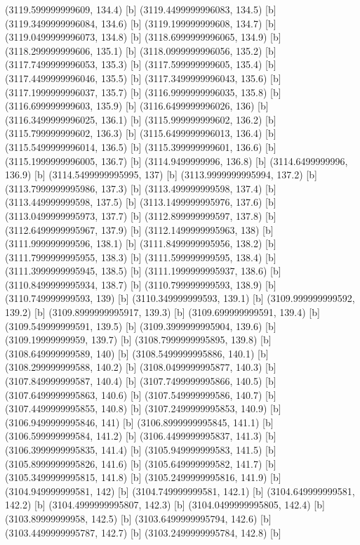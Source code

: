 {{{(3119.599999999609, 134.4) [b] 
(3119.4499999996083, 134.5) [b] 
(3119.3499999996084, 134.6) [b] 
(3119.199999999608, 134.7) [b] 
(3119.0499999996073, 134.8) [b] 
(3118.6999999996065, 134.9) [b] 
(3118.299999999606, 135.1) [b] 
(3118.0999999996056, 135.2) [b] 
(3117.7499999996053, 135.3) [b] 
(3117.599999999605, 135.4) [b] 
(3117.4499999996046, 135.5) [b] 
(3117.3499999996043, 135.6) [b] 
(3117.1999999996037, 135.7) [b] 
(3116.9999999996035, 135.8) [b] 
(3116.699999999603, 135.9) [b] 
(3116.6499999996026, 136) [b] 
(3116.3499999996025, 136.1) [b] 
(3115.999999999602, 136.2) [b] 
(3115.799999999602, 136.3) [b] 
(3115.6499999996013, 136.4) [b] 
(3115.5499999996014, 136.5) [b] 
(3115.399999999601, 136.6) [b] 
(3115.1999999996005, 136.7) [b] 
(3114.9499999996, 136.8) [b] 
(3114.6499999996, 136.9) [b] 
(3114.5499999995995, 137) [b] 
(3113.9999999995994, 137.2) [b] 
(3113.7999999995986, 137.3) [b] 
(3113.499999999598, 137.4) [b] 
(3113.449999999598, 137.5) [b] 
(3113.1499999995976, 137.6) [b] 
(3113.0499999995973, 137.7) [b] 
(3112.899999999597, 137.8) [b] 
(3112.6499999995967, 137.9) [b] 
(3112.1499999995963, 138) [b] 
(3111.999999999596, 138.1) [b] 
(3111.8499999995956, 138.2) [b] 
(3111.7999999995955, 138.3) [b] 
(3111.599999999595, 138.4) [b] 
(3111.3999999995945, 138.5) [b] 
(3111.1999999995937, 138.6) [b] 
(3110.8499999995934, 138.7) [b] 
(3110.799999999593, 138.9) [b] 
(3110.749999999593, 139) [b] 
(3110.349999999593, 139.1) [b] 
(3109.999999999592, 139.2) [b] 
(3109.8999999995917, 139.3) [b] 
(3109.699999999591, 139.4) [b] 
(3109.549999999591, 139.5) [b] 
(3109.3999999995904, 139.6) [b] 
(3109.19999999959, 139.7) [b] 
(3108.7999999995895, 139.8) [b] 
(3108.649999999589, 140) [b] 
(3108.5499999995886, 140.1) [b] 
(3108.299999999588, 140.2) [b] 
(3108.0499999995877, 140.3) [b] 
(3107.849999999587, 140.4) [b] 
(3107.7499999995866, 140.5) [b] 
(3107.6499999995863, 140.6) [b] 
(3107.549999999586, 140.7) [b] 
(3107.4499999995855, 140.8) [b] 
(3107.2499999995853, 140.9) [b] 
(3106.9499999995846, 141) [b] 
(3106.8999999995845, 141.1) [b] 
(3106.599999999584, 141.2) [b] 
(3106.4499999995837, 141.3) [b] 
(3106.3999999995835, 141.4) [b] 
(3105.949999999583, 141.5) [b] 
(3105.8999999995826, 141.6) [b] 
(3105.649999999582, 141.7) [b] 
(3105.3499999995815, 141.8) [b] 
(3105.2499999995816, 141.9) [b] 
(3104.949999999581, 142) [b] 
(3104.749999999581, 142.1) [b] 
(3104.649999999581, 142.2) [b] 
(3104.4999999995807, 142.3) [b] 
(3104.0499999995805, 142.4) [b] 
(3103.89999999958, 142.5) [b] 
(3103.6499999995794, 142.6) [b] 
(3103.4499999995787, 142.7) [b] 
(3103.2499999995784, 142.8) [b] 
}}}
